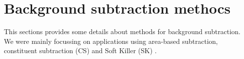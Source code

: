 
\section{Background subtraction methocs}
\label{app:background}

This sections provides some details about methods for background subtraction. We were mainly focussing on applications using area-based subtraction, constituent subtraction (CS) \cite{Berta:2014eza} and Soft Killer (SK) \cite{Cacciari:2014gra}. 
